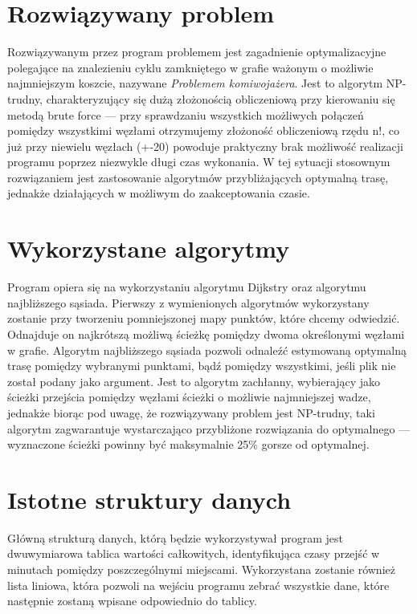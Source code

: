 \documentclass[12pt,a4paper]{article}
\begin{document}
\section{Rozwiązywany problem}
Rozwiązywanym przez program problemem jest zagadnienie optymalizacyjne polegające na znalezieniu cyklu zamkniętego w grafie ważonym o możliwie najmniejszym koszcie, nazywane \textsl{Problemem komiwojażera}. Jest to algorytm NP-trudny, charakteryzujący się dużą złożonością obliczeniową przy kierowaniu się metodą brute force --- przy sprawdzaniu wszystkich możliwych połączeń pomiędzy wszystkimi węzłami otrzymujemy złożoność obliczeniową rzędu n!, co już przy niewielu węzłach (+-20) powoduje praktyczny brak możliwość realizacji programu poprzez niezwykle długi czas wykonania. W tej sytuacji stosownym rozwiązaniem jest zastosowanie algorytmów przybliżających optymalną trasę, jednakże działających w możliwym do zaakceptowania czasie.
\section{Wykorzystane algorytmy}
Program opiera się na wykorzystaniu algorytmu Dijkstry oraz algorytmu najbliższego sąsiada. Pierwszy z wymienionych algorytmów wykorzystany zostanie przy tworzeniu pomniejszonej mapy punktów, które chcemy odwiedzić. Odnajduje on najkrótszą możliwą ścieżkę pomiędzy dwoma określonymi węzłami w grafie. Algorytm najbliższego sąsiada pozwoli odnaleźć estymowaną optymalną trasę pomiędzy wybranymi punktami, bądź pomiędzy wszystkimi, jeśli plik  nie został podany jako argument. Jest to algorytm zachłanny, wybierający jako ścieżki przejścia pomiędzy węzłami ścieżki o możliwie najmniejszej wadze, jednakże biorąc pod uwagę, że rozwiązywany problem jest NP-trudny, taki algorytm zagwarantuje wystarczająco przybliżone rozwiązania do optymalnego --- wyznaczone ścieżki powinny być maksymalnie 25\% gorsze od optymalnej.
\section{Istotne struktury danych}
Główną strukturą danych, którą będzie wykorzystywał program jest dwuwymiarowa tablica wartości całkowitych, identyfikująca czasy przejść w minutach pomiędzy poszczególnymi miejscami. Wykorzystana zostanie również lista liniowa, która pozwoli na wejściu programu zebrać wszystkie dane, które następnie zostaną wpisane odpowiednio do tablicy.
\end{document}
